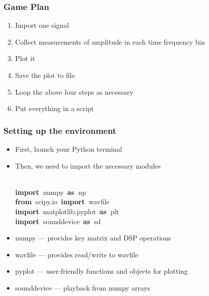 \documentclass{beamer}\usepackage[]{graphicx}\usepackage[]{color}
\makeatletter
\newcommand{\hlopt}[1]{\textcolor[rgb]{0,0,0}{#1}}%
\newcommand{\hlstd}[1]{\textcolor[rgb]{0.345,0.345,0.345}{#1}}%
\newcommand{\hlkwa}[1]{\textcolor[rgb]{0.161,0.373,0.58}{\textbf{#1}}}%
\newenvironment{kframe}{%
 \def\at@end@of@kframe{}%
 \ifinner\ifhmode%
  \def\at@end@of@kframe{\end{minipage}}%
  \begin{minipage}{\columnwidth}%
 \fi\fi%
 \def\FrameCommand##1{\hskip\@totalleftmargin \hskip-\fboxsep
 \colorbox{shadecolor}{##1}\hskip-\fboxsep
     \hskip-\linewidth \hskip-\@totalleftmargin \hskip\columnwidth}%
 \MakeFramed {\advance\hsize-\width
   \@totalleftmargin\z@ \linewidth\hsize
   \@setminipage}}%
 {\par\unskip\endMakeFramed%
 \at@end@of@kframe}
\newenvironment{knitrout}{}{} %
\makeatother
\begin{document}
\begin{frame}[fragile]
\frametitle{Game Plan}
\begin{enumerate}
		\item Import one signal

		\item Collect measurements of amplitude in each time frequency bin 

		\item Plot it

		\item Save the plot to file

		\item Loop the above four steps as necessary

		\item Put everything in a script
\end{enumerate}
\end{frame}

\begin{frame}[fragile]
\frametitle{Setting up the environment}
\begin{itemize}
	\item First, launch your Python terminal

	\item Then, we need to import the necessary modules
\begin{knitrout}
\color{fgcolor}\begin{kframe}
\noindent
\ttfamily
\hlstd{}\hspace*{\fill}\\
\hlkwa{import\ }\hlstd{numpy\ }\hlkwa{as\ }\hlstd{np}\hspace*{\fill}\\
\hlkwa{from\ }\hlstd{scipy}\hlopt{.}\hlstd{io\ }\hlkwa{import\ }\hlstd{wavfile}\hspace*{\fill}\\
\hlkwa{import\ }\hlstd{matplotlib}\hlopt{.}\hlstd{pyplot\ }\hlkwa{as\ }\hlstd{plt}\hspace*{\fill}\\
\hlkwa{import\ }\hlstd{sounddevice\ }\hlkwa{as\ }\hlstd{sd}\hspace*{\fill}\\
\hspace*{\fill}
\mbox{}
\normalfont
\end{kframe}
\end{knitrout}
\end{itemize}

\begin{itemize}
	\item numpy --- provides key matrix and DSP operations

	\item wavfile --- provides read/write to wavfile
	
	\item pyplot --- user-friendly functions and objects for plotting

	\item sounddevice --- playback from numpy arrays
\end{itemize}
\end{frame}
\end{document}

